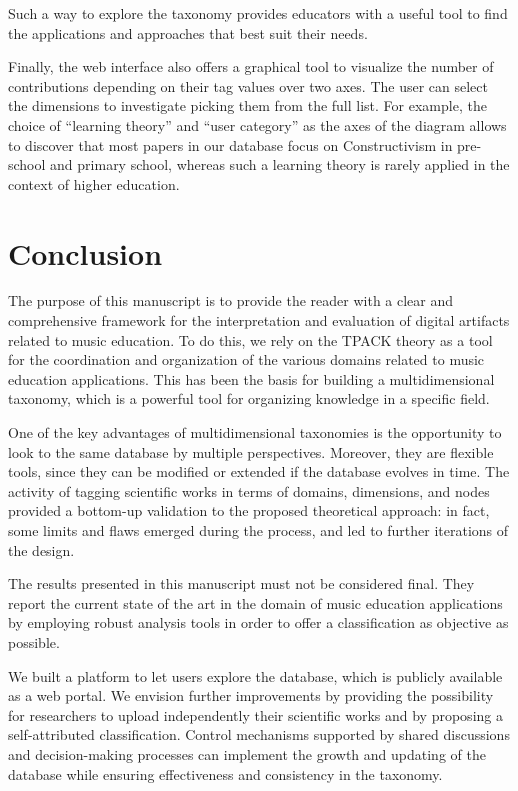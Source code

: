 \documentclass[journal]{IEEEtran}
\begin{document}
Such a way to explore the taxonomy provides educators with a useful tool to find the applications and approaches that best suit their needs.

Finally, the web interface also offers a graphical tool to visualize the number of contributions depending on their tag values over two axes. The user can select the dimensions to investigate picking them from the full list. For example, the choice of ``learning theory'' and ``user category'' as the axes of the diagram allows to discover that most papers in our database focus on Constructivism in pre-school and primary school, whereas such a learning theory is rarely applied in the context of higher education.


\section{Conclusion}
\label{sec:conc}

The purpose of this manuscript is to provide the reader with a clear and comprehensive framework for the interpretation and evaluation of digital artifacts related to music education. To do this, we rely on the TPACK theory as a tool for the coordination and organization of the various domains related to music education applications. This has been the basis for building a multidimensional taxonomy, which is a powerful tool for organizing knowledge in a specific field. 

One of the key advantages of multidimensional taxonomies is the opportunity to look to the same database by multiple perspectives. Moreover, they are flexible tools, since they can be modified or extended if the database evolves in time. 
The activity of tagging scientific works in terms of domains, dimensions, and nodes provided a bottom-up validation to the proposed theoretical approach: in fact, some limits and flaws emerged during the process, and led to further iterations of the design.

The results presented in this manuscript must not be considered final. They report the current state of the art in the domain of music education applications by employing robust analysis tools in order to offer a classification as objective as possible. 

We built a platform to let users explore the database, which is publicly available as a web portal. We envision further improvements by providing the possibility for researchers to upload independently their scientific works and by proposing a self-attributed classification. Control mechanisms supported by shared discussions and decision-making processes can implement the growth and updating of the database while ensuring effectiveness and consistency in the taxonomy.
\end{document}

